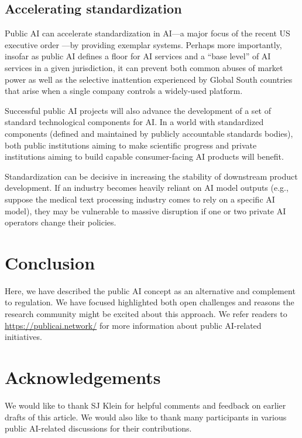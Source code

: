 \documentclass{article}
\begin{document}
\subsection{Accelerating standardization}\label{sec:standards}

Public AI can accelerate standardization in AI---a major focus of the recent US executive order \cite{thewhitehouseFACTSHEETPresident2023}---by providing exemplar systems. Perhaps more importantly, insofar as public AI defines a floor for AI services and a ``base level'' of AI services in a given jurisdiction, it can prevent both common abuses of market power as well as the selective inattention experienced by Global South countries that arise when a single company controls a widely-used platform.

Successful public AI projects will also advance the development of a set of standard technological components for AI. In a world with standardized components (defined and maintained by publicly accountable standards bodies), both public institutions aiming to make scientific progress and private institutions aiming to build capable consumer-facing AI products will benefit.

Standardization can be decisive in increasing the stability of downstream product development. If an industry becomes heavily reliant on AI model outputs (e.g., suppose the medical text processing industry comes to rely on a specific AI model), they may be vulnerable to massive disruption if one or two private AI operators change their policies.



\section{Conclusion}
Here, we have described the public AI concept as an alternative and complement to regulation. We have focused highlighted both open challenges and reasons the research community might be excited about this approach. We refer readers to \url{https://publicai.network/} for more information about public AI-related initiatives.

\section*{Acknowledgements}
We would like to thank SJ Klein for helpful comments and feedback on earlier drafts of this article. We would also like to thank many participants in various public AI-related discussions for their contributions.



\end{document}
